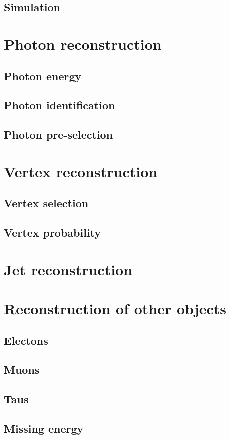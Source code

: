 \subsection{Simulation}

\section{Photon reconstruction}
\subsection{Photon energy}
\subsection{Photon identification}
\subsection{Photon pre-selection}

\section{Vertex reconstruction}
\subsection{Vertex selection}
\subsection{Vertex probability}

\section{Jet reconstruction}

\section{Reconstruction of other objects}
\subsection{Electons}
\subsection{Muons}
\subsection{Taus}
\subsection{Missing energy}
